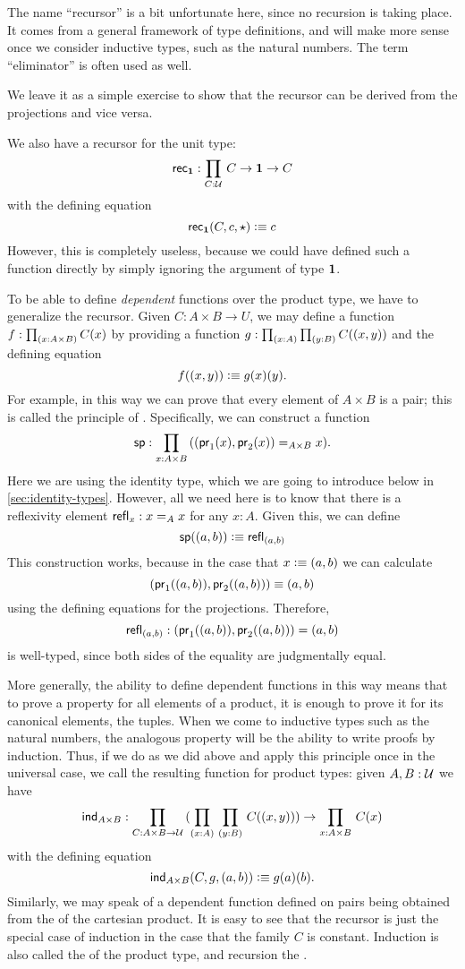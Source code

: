The name ``recursor'' is a bit unfortunate here, since no recursion is taking place.
It comes from a general framework of type definitions, and will make more sense once we consider inductive types, such as
the natural numbers.  The term ``eliminator'' is often used as well.

We leave it as a simple exercise to show that the recursor can be
derived from the projections and vice versa.

We also have a recursor for the unit type:
\[\rec{\unit} : \prd{C:\UU}C \to \unit \to C\]
with the defining equation
\[ \mathsf{rec}_{\mathbf{1}}(C,c,\star) \vcentcolon\equiv c \]
However, this is completely useless,
because we could have defined such a function directly
by simply ignoring the argument of type $\mathbf{1}$.

To be able to define \emph{dependent} functions over the product type, we have
to generalize the recursor. Given $C: A \times B \to U$, we may
define a function $f : \prd{x : A \times B} C(x)$ by providing a
function $g : \prd{x:A}\prd{y:B} C(\tup{x}{y})$ and the defining equation
\[ f((x,y)) \vcentcolon\equiv g(x)(y). \] 
For example, in this way we can prove that every element of $A\times B$ is a pair; this is called the principle of .
Specifically, we can construct a function
\[ \spr : \prd{x:A \times B} (\tup{\fst {(x)}}{\snd {(x)}} =_{A\times B} x). \]
Here we are using the identity type, which we are going to introduce below in \autoref{sec:identity-types}.
However, all we need here is to know that there is a reflexivity element $\mathsf{refl}_{x} : x =_A x$ for any $x:A$.
Given this, we can define
\[ \mathsf{sp}((a,b)) \vcentcolon\equiv \mathsf{refl}_{(a,b)} \]
This construction works, because in the case that $x \vcentcolon\equiv (a,b)$ we can 
calculate 
\[ (\mathsf{pr}_{1}((a,b)),\mathsf{pr}_{2}{((a,b))}) \equiv (a,b) \]
using the defining equations for the projections. Therefore,
\[ \mathsf{refl}_{(a,b)} : (\mathsf{pr}_{1}((a,b)),\mathsf{pr}_{2}{((a,b))}) = (a,b) \]
is well-typed, since both sides of the equality are judgmentally equal.

More generally, the ability to define dependent functions in this way means that to prove a property for all elements of a product, it is enough 
to prove it for its canonical elements, the tuples.
When we come to inductive types such as the natural numbers, the analogous property will be the ability to write proofs by induction.
Thus, if we do as we did above and apply this principle once in the universal case, we call the resulting function
 for product types: given $A,B : \mathcal{U}$ we have
\[ \ind{A\times B} : \prd{C:A \times B \to \UU} (\prd{x:A}{y:B}
C(\tup{x}{y})) \to \prd{x:A \times B} C(x) \]
with the defining equation 
\[ \mathsf{ind}_{A\times B}(C,g,(a,b)) \vcentcolon\equiv g(a)(b). \]
Similarly, we may speak of a dependent function defined on pairs being obtained from the  of the cartesian product.
It is easy to see that the recursor is just the special case of induction
in the case that the family $C$ is constant.
Induction is also called the  of the product type, and recursion the .

